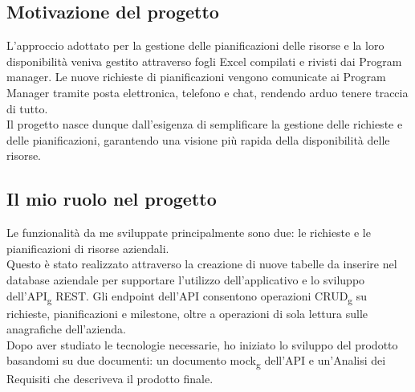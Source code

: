 \subsection{Motivazione del progetto}
L'approccio adottato per la gestione delle pianificazioni delle risorse e la loro disponibilità veniva gestito attraverso fogli Excel compilati e rivisti dai Program manager. Le nuove richieste di pianificazioni vengono comunicate ai Program Manager tramite posta elettronica, telefono e chat, rendendo arduo tenere traccia di tutto.\\
Il progetto nasce dunque dall’esigenza di semplificare la gestione delle richieste e delle pianificazioni, garantendo una visione più rapida della disponibilità delle risorse.\\

\subsection{Il mio ruolo nel progetto}
Le funzionalità da me sviluppate principalmente sono due: le richieste e le pianificazioni di risorse aziendali.\\
Questo è stato realizzato attraverso la creazione di nuove tabelle da inserire nel database aziendale per supportare l'utilizzo dell'applicativo e lo sviluppo dell'API\textsubscript{g} REST. Gli endpoint dell'API consentono operazioni CRUD\textsubscript{g} su richieste, pianificazioni e milestone, oltre a operazioni di sola lettura sulle anagrafiche dell'azienda.\\
Dopo aver studiato le tecnologie necessarie, ho iniziato lo sviluppo del prodotto basandomi su due documenti: un documento mock\textsubscript{g} dell'API e un'Analisi dei Requisiti che descriveva il prodotto finale.


